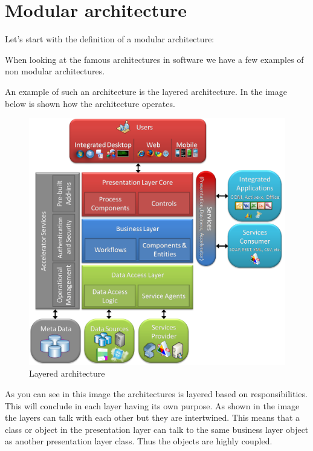 \chapter{Modular architecture}
\label{sec:ModularArchitecture}

Let's start with the definition of a modular architecture:

When looking at the famous architectures in software we have a few examples of non
modular architectures.

An example of such an architecture is the layered architecture. In the image below is shown how the architecture operates.

\begin{figure}[H]
	\includegraphics[width=\linewidth]{layered_architecture.png}
	\caption{Layered architecture \cite{layeredArchitecture}}
\end{figure}

As you can see in this image the architectures is layered based on responsibilities. This will conclude in each layer having its own purpose. As shown in the image the layers can talk with each other but they are intertwined. This means that a class or object in the presentation layer can talk to the same business layer object as another presentation layer class. Thus the objects are highly coupled.

